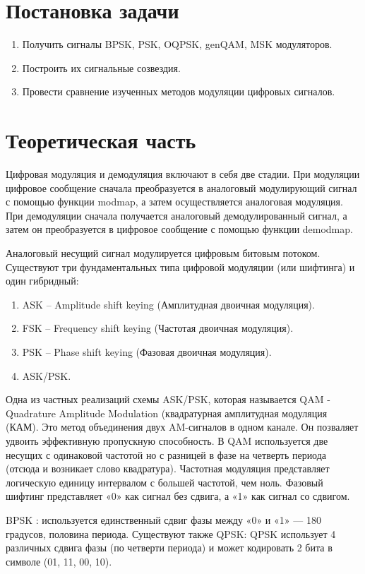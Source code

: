 \documentclass[10pt,a4paper,oneside]{article}
\begin{document}
\section{Постановка задачи}
\begin{enumerate}
\item Получить сигналы BPSK, PSK, OQPSK, genQAM, MSK модуляторов.
\item Построить их сигнальные созвездия.
\item Провести сравнение изученных методов модуляции цифровых сигналов.
\end{enumerate}

\section{Теоретическая часть}
Цифровая модуляция и демодуляция включают в себя две стадии. При модуляции цифровое сообщение сначала преобразуется в аналоговый модулирующий сигнал с помощью функции modmap, а затем осуществляется аналоговая модуляция. При демодуляции сначала получается аналоговый демодулированный сигнал, а затем он преобразуется в цифровое сообщение с помощью функции demodmap.

Аналоговый несущий сигнал модулируется цифровым битовым потоком.
Существуют три фундаментальных типа цифровой модуляции (или шифтинга) и один гибридный:
\begin{enumerate}
	\item ASK – Amplitude shift keying (Амплитудная двоичная модуляция).
	\item FSK – Frequency shift keying (Частотая двоичная модуляция).
	\item PSK – Phase shift keying (Фазовая двоичная модуляция).
	\item ASK/PSK.
\end{enumerate}
Одна из частных реализаций схемы ASK/PSK, которая называется QAM - Quadrature Amplitude Modulation (квадратурная амплитудная модуляция (КАМ). Это метод объединения двух AM-сигналов в одном канале. Он позваляет удвоить эффективную пропускную способность. В QAM используется две несущих с одинаковой частотой но с разницей в фазе на четверть периода (отсюда и возникает слово квадратура). 
Частотная модуляция представляет логическую единицу интервалом с большей частотой, чем ноль.
Фазовый шифтинг представляет «0» как сигнал без сдвига, а «1» как сигнал со сдвигом.

BPSK : используется единственный сдвиг фазы между «0» и «1» — 180 градусов, половина периода.
Существуют также QPSK:
QPSK использует 4 различных сдвига фазы (по четверти периода) и может кодировать 2 бита в символе (01, 11, 00, 10). 
\newpage
\end{document}
